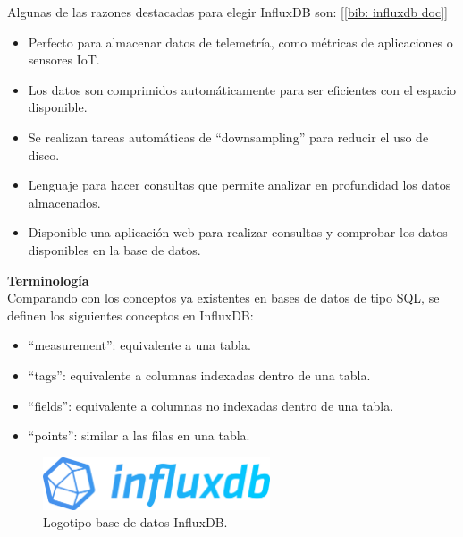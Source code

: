 \documentclass[a4paper, oneside, 12pt]{book}
\begin{document}
	\noindent Algunas de las razones destacadas para elegir InfluxDB son: [\ref{bib: influxdb doc}]
	
	\begin{itemize}
		\item Perfecto para almacenar datos de telemetría, como métricas de aplicaciones o sensores IoT.
		\item Los datos son comprimidos automáticamente para ser eficientes con el espacio disponible.
		\item Se realizan tareas automáticas de ``downsampling'' para reducir el uso de disco.
		\item Lenguaje para hacer consultas que permite analizar en profundidad los datos almacenados.
		\item Disponible una aplicación web para realizar consultas y comprobar los datos disponibles en la base de datos.
	\end{itemize}

	\vspace{10px}

	\noindent \textbf{\large Terminología} \\
	
	\noindent Comparando con los conceptos ya existentes en bases de datos de tipo SQL, se definen los siguientes conceptos en InfluxDB:
	
	\begin{itemize}
		\item ``measurement'': equivalente a una tabla.
		\item ``tags'': equivalente a columnas indexadas dentro de una tabla.
		\item ``fields'': equivalente a columnas no indexadas dentro de una tabla.
		\item ``points'': similar a las filas en una tabla.
	\end{itemize}

	\vspace{20px}

	\begin{figure}[h!]
		\begin{center}
			\includegraphics[width=0.6\textwidth]{img/InfluxDB.png}
			\caption{Logotipo base de datos InfluxDB.}
			\label{img: influxdb logo}
		\end{center}
	\end{figure}
\end{document}
